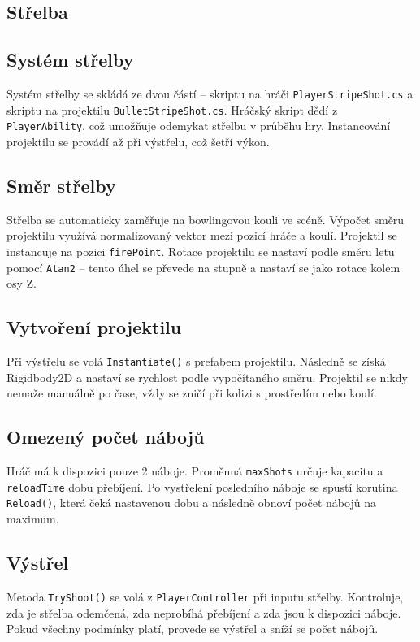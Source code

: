 \subsection{Střelba}

\subsection{Systém střelby}
Systém střelby se skládá ze dvou částí -- skriptu na hráči \texttt{PlayerStripeShot.cs} a skriptu na projektilu \texttt{BulletStripeShot.cs}. Hráčský skript dědí z \texttt{PlayerAbility}, což umožňuje odemykat střelbu v průběhu hry. Instancování projektilu se provádí až při výstřelu, což šetří výkon.

\subsection{Směr střelby}
Střelba se automaticky zaměřuje na bowlingovou kouli ve scéně. Výpočet směru projektilu využívá normalizovaný vektor mezi pozicí hráče a koulí. Projektil se instancuje na pozici \texttt{firePoint}. Rotace projektilu se nastaví podle směru letu pomocí \texttt{Atan2} -- tento úhel se převede na stupně a nastaví se jako rotace kolem osy Z.

\subsection{Vytvoření projektilu}
Při výstřelu se volá \texttt{Instantiate()} s prefabem projektilu. Následně se získá Rigidbody2D a nastaví se rychlost podle vypočítaného směru. Projektil se nikdy nemaže manuálně po čase, vždy se zničí při kolizi s prostředím nebo koulí.

\subsection{Omezený počet nábojů}
Hráč má k dispozici pouze 2 náboje. Proměnná \texttt{maxShots} určuje kapacitu a \texttt{reloadTime} dobu přebíjení. Po vystřelení posledního náboje se spustí korutina \texttt{Reload()}, která čeká nastavenou dobu a následně obnoví počet nábojů na maximum. 

\subsection{Výstřel}
Metoda \texttt{TryShoot()} se volá z \texttt{PlayerController} při inputu střelby. Kontroluje, zda je střelba odemčená, zda neprobíhá přebíjení a zda jsou k dispozici náboje. Pokud všechny podmínky platí, provede se výstřel a sníží se počet nábojů.

